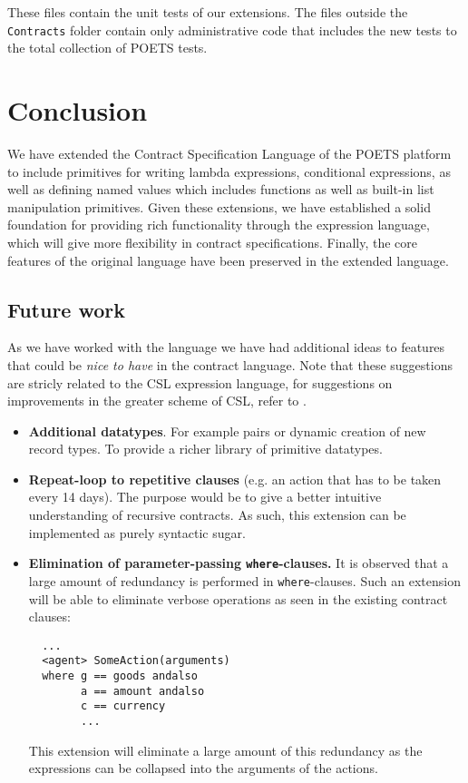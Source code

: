 \documentclass[10pt,a4paper,final,oneside,openany,article]{memoir}
\begin{document}
These files contain the unit tests of our extensions. The files
outside the \verb+Contracts+ folder contain only administrative code
that includes the new tests to the total collection of POETS tests.

\chapter{Conclusion}
We have extended the Contract Specification Language of the POETS
platform to include primitives for writing lambda expressions,
conditional expressions, as well as defining named values which includes
functions as well as built-in list manipulation primitives. Given these
extensions, we have established a solid foundation for providing rich
functionality through the expression language, which will give more
flexibility in contract specifications.
Finally, the core features of the original language \cite[page
4]{hvitved10} have been preserved in the extended language.


\section{Future work}
As we have worked with the language we have had additional ideas to
features that could be \textit{nice to have} in the contract language.
Note that these suggestions are stricly related to the CSL expression
language, for suggestions on improvements in the greater scheme of CSL,
refer to \cite{hvitved10}.
\begin{itemize}
\item \textbf{Additional datatypes}. For example pairs or dynamic
  creation of new record types. To provide a richer library of primitive
  datatypes.
\item \textbf{Repeat-loop to repetitive clauses} (e.g. an action that
  has to be taken every 14 days). The purpose would be to give a better
  intuitive understanding of recursive contracts. As such, this
  extension can be implemented as purely syntactic sugar.
\item \textbf{Elimination of parameter-passing \lstinline{where}-clauses.} It is
  observed that a large amount of redundancy is performed in
  \lstinline{where}-clauses. Such an extension will be able to eliminate
  verbose operations as seen in the existing contract clauses:
  \begin{lstlisting}
  ...
  <agent> SomeAction(arguments)
  where g == goods andalso
        a == amount andalso
        c == currency
        ...
  \end{lstlisting}
  This extension will eliminate a large amount of this redundancy as
  the expressions can be collapsed into the arguments of the actions.
\end{itemize}
\end{document}
